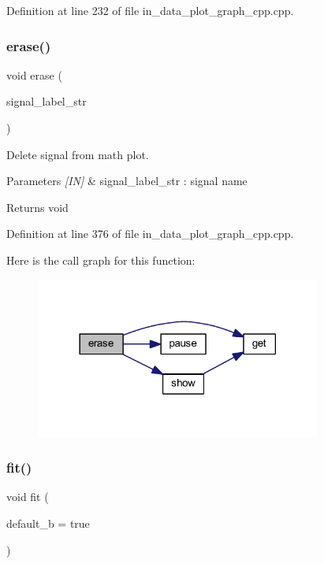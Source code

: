 Definition at line 232 of file in\+\_\+data\+\_\+plot\+\_\+graph\+\_\+cpp.\+cpp.

\mbox{\label{group__data__plot_ga7197f46e16d05c9055786f69bbd50201}} 
\subsubsection{erase()}
{\footnotesize\ttfamily void erase (\begin{DoxyParamCaption}\item[{wx\+String}]{signal\+\_\+label\+\_\+str }\end{DoxyParamCaption})}



Delete signal from math plot. 


\begin{DoxyParams}{Parameters}
{\em \mbox{[}\+I\+N\mbox{]}} & signal\+\_\+label\+\_\+str \+: signal name \\
\hline
\end{DoxyParams}
\begin{DoxyReturn}{Returns}
void 
\end{DoxyReturn}


Definition at line 376 of file in\+\_\+data\+\_\+plot\+\_\+graph\+\_\+cpp.\+cpp.

Here is the call graph for this function\+:
\nopagebreak
\begin{figure}[H]
\begin{center}
\leavevmode
\includegraphics[width=266pt]{group__data__plot_ga7197f46e16d05c9055786f69bbd50201_cgraph}
\end{center}
\end{figure}
\mbox{\label{group__data__plot_gaf4809e08728fcad5e35d8c3c6d2a114c}} 
\subsubsection{fit()}
{\footnotesize\ttfamily void fit (\begin{DoxyParamCaption}\item[{bool}]{default\+\_\+b = {\ttfamily true} }\end{DoxyParamCaption})}



